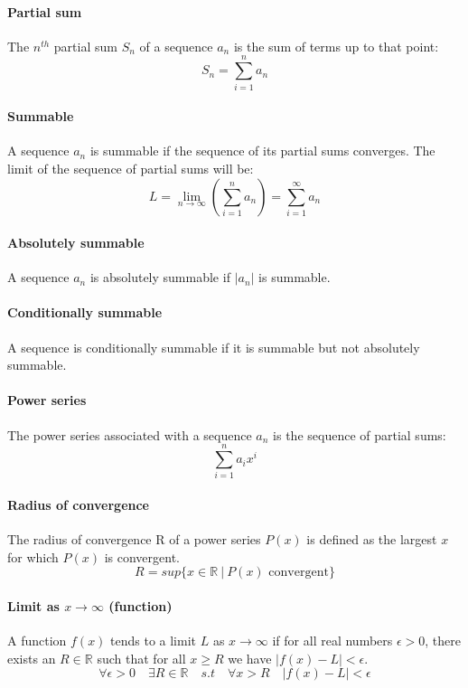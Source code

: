 \documentclass{scrartcl}
\newcommand{\R}{\mathbb{R}}
\begin{document}
\paragraph{Partial sum}
The $ n^{th} $ partial sum $ S_{n} $ of a sequence $ a_{n} $ is the sum of terms up to that point:
\begin{equation}
S_{n} = \sum_{i=1}^{n} a_{n}
\end{equation}
\paragraph{Summable}
A sequence $ a_n $ is summable if the sequence of its partial sums converges. The limit of the sequence of partial sums will be:
\begin{equation}
L = \lim_{n \to \infty} (\sum_{i=1}^{n} a_{n}) = \sum_{i=1}^{\infty} a_{n}
\end{equation}
\paragraph{Absolutely summable}
A sequence $ a_{n} $ is absolutely summable if $ |a_{n}| $ is summable.
\paragraph{Conditionally summable}
A sequence is conditionally summable if it is summable but not absolutely summable.
\paragraph{Power series}
The power series associated with a sequence $ a_{n} $ is the sequence of partial sums:
\begin{equation}
\sum_{i=1}^{n} a_{i}x^{i}
\end{equation}
\paragraph{Radius of convergence}
The radius of convergence R of a power series $ P(x) $ is defined as the largest $ x $ for which $ P(x) $ is convergent.
\begin{equation}
R = sup\{x \in \R \ | \ P(x) \textrm{ convergent}\}
\end{equation}
\paragraph{Limit as $ x \to \infty $ (function)}
A function $ f(x) $ tends to a limit $ L $ as $ x \to \infty $ if for all real numbers $ \epsilon > 0 $, there exists an $ R \in \R $ such that for all $ x \geq R $ we have $ |f(x) - L| < \epsilon $.
\begin{equation}
\forall \epsilon > 0 \quad \exists R \in \R \quad s.t \quad \forall x > R \quad |f(x) - L| < \epsilon
\end{equation}
\end{document}
